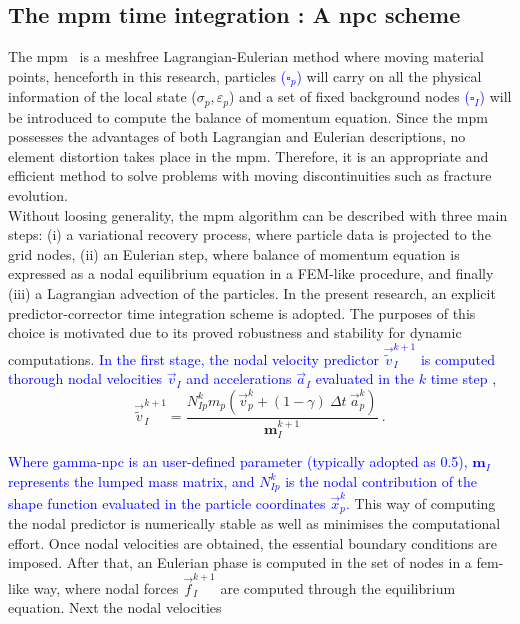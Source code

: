 \message{ !name(2020_EFM_MPM_Eigensoftening.tex)}\documentclass[preprint,12pt,a4paper]{elsarticle}
\newcommand{\tens}[1]{
  \ensuremath{\mathbf{{#1}}}
}
\newcommand{\MMP}[1]{
  \textcolor{blue}{{#1}}
}
\begin{document}
\subsection{The \acrshort{mpm} time integration : A \acrlong{npc}  scheme}
\label{sec:2.1}
The \acrshort{mpm}~\cite{Sulsky1994} is a meshfree Lagrangian-Eulerian
method where moving material points, henceforth in this research,
particles \MMP{($\square_p$)} will carry on all the physical information of the local state ($\sigma_p,
\varepsilon_p$) and a set of fixed background nodes \MMP{($\square_I$)} will
be introduced to compute the balance of momentum equation. Since the
\acrshort{mpm} possesses the advantages of both Lagrangian and
Eulerian descriptions, no element distortion takes place in the
\acrshort{mpm}. Therefore, it is an appropriate and efficient method
to solve problems with moving discontinuities such as fracture evolution.\\
Without loosing generality, the \acrshort{mpm} algorithm
can be described with three main steps: (i) a variational recovery
process, where particle data is projected to the grid nodes, (ii) an
Eulerian step, where balance of momentum equation is expressed as a
nodal equilibrium equation in a FEM-like procedure, and finally
(iii) a Lagrangian advection of the particles. In the present research,
an explicit predictor-corrector time integration scheme is adopted. The
purposes of this choice is motivated due to its proved robustness and
stability for dynamic computations. \MMP{In the first stage, the nodal
velocity predictor $ \vec{\tilde{v}}_I^{k+1}$ is computed thorough
nodal velocities $\vec{v}_I$ and accelerations $\vec{a}_I$ evaluated
in the $k$ time step},
\begin{equation}
  \label{eq:Predictor-velocity}
  \vec{\tilde{v}}_I^{k+1} = \frac{N_{Ip}^{k} m_p (\vec{v}_p^k + (1 - \gamma)\ \Delta t\ \vec{a}_p^k)}{\tens{m}_I^{k+1}}\ .
\end{equation}
\MMP{Where \gls{gamma-npc} is an user-defined parameter (typically adopted as
0.5), $\tens{m}_I$ represents the lumped mass matrix, and $N_{Ip}^{k}$ is
the nodal contribution of the shape function evaluated in the particle
coordinates $\vec{x}_p^k$.} This way of computing the nodal predictor is numerically stable
as well as minimises the computational effort. Once nodal velocities are
obtained, the essential boundary conditions are imposed. After that, an
Eulerian phase is computed in the set of nodes in a
\acrshort{fem}-like way, where nodal forces $\vec{f}_{I}^{k+1}$ are
computed through the equilibrium equation. Next the nodal velocities
\end{document}
